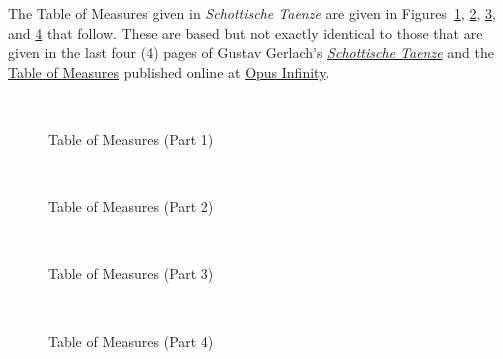 \documentclass[a4paper,x11names,svgnames,10pt]{article}
\begin{document}
{The Table of Measures given in {\em Schottische Taenze} are given in Figures~\ref{fig:meas1}, \ref{fig:meas2}, \ref{fig:meas3}, and \ref{fig:meas4} that follow.  These are based but not exactly identical to those that are given in the last four (4) pages of Gustav Gerlach's \href{https://imslp.org/wiki/Kunst\%2C\_Schottische\_Taenze\_zu\_componiren\%2C\_ohne_musicalisch\_zu\_sein\_(Gerlach\%2C\_Gustav)}{{\em Schottische Taenze}} and the  \href{https://opus-infinity.org/dice_games/gerlach_scottish_dance/measures/}{Table of Measures} published online at  \href{https://opus-infinity.org}{Opus Infinity}.

\newpage
${}_{}$\\
\vspace{0.10in}
\begin{figure}[H]
	\centering
	\def\svgwidth{0.975\columnwidth}
	
	\caption{Table of Measures (Part 1)}
	\label{fig:meas1}
\end{figure}

\newpage
${}_{}$\\
\vspace{0.10in}
\begin{figure}[H]
	\centering
	\def\svgwidth{0.975\columnwidth}
	
	\caption{Table of Measures (Part 2)}
	\label{fig:meas2}
\end{figure}

\newpage
${}_{}$\\
\vspace{0.10in}
\begin{figure}[H]
	\centering
	\def\svgwidth{0.975\columnwidth}
	
	\caption{Table of Measures (Part 3)}
	\label{fig:meas3}
\end{figure}

\newpage
${}_{}$\\
\vspace{0.10in}
\begin{figure}[H]
	\centering
	\def\svgwidth{0.975\columnwidth}
	
	\caption{Table of Measures (Part 4)}
	\label{fig:meas4}
\end{figure}


}
\end{document}
